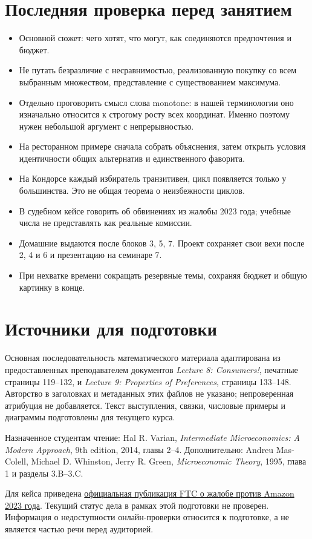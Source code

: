 \documentclass[11pt,a4paper]{article}
\begin{document}
\section{Последняя проверка перед занятием}
\begin{itemize}[leftmargin=*]
\item Основной сюжет: чего хотят, что могут, как соединяются предпочтения и бюджет.
\item Не путать безразличие с несравнимостью, реализованную покупку со всем выбранным множеством, представление с существованием максимума.
\item Отдельно проговорить смысл слова monotone: в нашей терминологии оно изначально относится к строгому росту всех координат. Именно поэтому нужен небольшой аргумент с непрерывностью.
\item На ресторанном примере сначала собрать объяснения, затем открыть условия идентичности общих альтернатив и единственного фаворита.
\item На Кондорсе каждый избиратель транзитивен, цикл появляется только у большинства. Это не общая теорема о неизбежности циклов.
\item В судебном кейсе говорить об обвинениях из жалобы 2023 года; учебные числа не представлять как реальные комиссии.
\item Домашние выдаются после блоков 3, 5, 7. Проект сохраняет свои вехи после 2, 4 и 6 и презентацию на семинаре 7.
\item При нехватке времени сокращать резервные темы, сохраняя бюджет и общую картинку в конце.
\end{itemize}

\section{Источники для подготовки}
Основная последовательность математического материала адаптирована из предоставленных преподавателем документов \emph{Lecture 8: Consumers!}, печатные страницы 119--132, и \emph{Lecture 9: Properties of Preferences}, страницы 133--148. Авторство в заголовках и метаданных этих файлов не указано; непроверенная атрибуция не добавляется. Текст выступления, связки, числовые примеры и диаграммы подготовлены для текущего курса.

Назначенное студентам чтение: Hal R. Varian, \emph{Intermediate Microeconomics: A Modern Approach}, 9th edition, 2014, главы 2--4. Дополнительно: Andreu Mas-Colell, Michael D. Whinston, Jerry R. Green, \emph{Microeconomic Theory}, 1995, глава 1 и разделы 3.B--3.C.

Для кейса приведена \href{https://www.ftc.gov/news-events/news/press-releases/2023/09/ftc-sues-amazon-illegally-maintaining-monopoly-power}{официальная публикация FTC о жалобе против Amazon 2023 года}. Текущий статус дела в рамках этой подготовки не проверен. Информация о недоступности онлайн-проверки относится к подготовке, а не является частью речи перед аудиторией.
\end{document}
